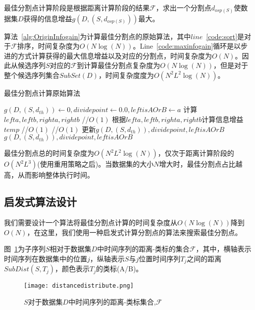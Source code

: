 最佳分割点计算阶段是根据距离计算阶段的结果$\mathcal{F}$，求出一个分割点$d_{osp(S)}$使数据集$D$获得的信息增益$g(D,(S,d_{osp(S)}))$最大。

算法~\ref{alg:OriginInfogain}为计算最佳分割点的原始算法，其中$line$~\ref{code:sort}是对于$\mathcal{F}$排序，时间复杂度为$O(N\log(N))$。Line~\ref{code:maxinfogain}循环是以步进的方式计算获得的最大信息增益以及对应的分割点，时间复杂度为$O(N)$。因此从候选序列$S$对应的$\mathcal{F}$到计算最佳分割点复杂度为$O(N\log(N))$，但是对于整个候选序列集合$SubSet(D)$，时间复杂度度为$O(N^2L^2\log(N))$。

\begin{algorithm}
	\caption{最佳分割点计算原始算法}
	\label{alg:OriginInfogain}
	\begin{algorithmic}[1]
			\State {} \label{code:sort}
			\State $g(D,(S,d_{th}))\gets 0,dividepoint\gets 0.0,leftisAOrB\gets a$
			 \label{code:} \label{code:maxinfogain}
				\State 计算$lefta,leftb,righta,rightb$ //$O(1)$%
				\State 根据$lefta,leftb,righta,rightb$计算信息增益$temp$ //$O(1)$
				 //$O(1)$
					\State 更新$g(D,(S,d_{th})),dividepoint,leftisAOrB$
				\EndIf
			\EndFor
			\State \Return $g(D,(S,d_{th})),dividepoint,leftisAOrB$
		\EndFunction
	\end{algorithmic}
\end{algorithm}

最佳分割点总的时间复杂度为$O(N^2L^2\log(N))$，仅次于距离计算阶段的$O(N^2L^3)$(使用重用策略之后)。当数据集的大小$N$增大时，最佳分割点占比越高，从而影响整体执行时间。

\subsection{启发式算法设计}
\label{cha:chap04:myalg:infogain:design}

我们需要设计一个算法将最佳分割点计算的时间复杂度从$O(N\log(N))$降到$O(N)$，在这里，我们使用一种启发式计算分割点的算法来搜索最佳分割点。

图~\ref{fig:distancedistribute}为子序列$S$相对于数据集$D$中时间序列的距离-类标的集合$\mathcal{F}$，其中，横轴表示时间序列在数据集中的位置$j$，纵轴表示$S$与$j$位置时间序列$T_j$之间的距离$SubDist(S,T_j)$，颜色表示$T_j$的类标(A/B)。
\begin{figure}[H] %
	\centering
	\texttt{[image: distancedistribute.png]}
	\caption{$S$对于数据集$D$中时间序列的距离-类标集合,$\mathcal{F}$}
	\label{fig:distancedistribute}
\end{figure}

